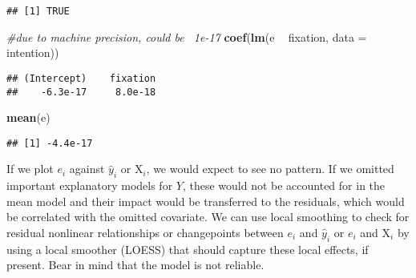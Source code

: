 \documentclass[
]{book}
\newenvironment{Shaded}{\begin{snugshade}}{\end{snugshade}}
\newcommand{\CharTok}[1]{\textcolor[rgb]{0.31,0.60,0.02}{#1}}
\newcommand{\CommentTok}[1]{\textcolor[rgb]{0.56,0.35,0.01}{\textit{#1}}}
\newcommand{\DataTypeTok}[1]{\textcolor[rgb]{0.13,0.29,0.53}{#1}}
\newcommand{\DecValTok}[1]{\textcolor[rgb]{0.00,0.00,0.81}{#1}}
\newcommand{\KeywordTok}[1]{\textcolor[rgb]{0.13,0.29,0.53}{\textbf{#1}}}
\newcommand{\NormalTok}[1]{#1}
\newcommand{\OperatorTok}[1]{\textcolor[rgb]{0.81,0.36,0.00}{\textbf{#1}}}
\newcommand{\StringTok}[1]{\textcolor[rgb]{0.31,0.60,0.02}{#1}}
\begin{document}
\begin{verbatim}
## [1] TRUE
\end{verbatim}

\begin{Shaded}
\begin{Highlighting}[]
\CommentTok{#due to machine precision, could be ~1e-17}
\KeywordTok{coef}\NormalTok{(}\KeywordTok{lm}\NormalTok{(e }\OperatorTok{~}\StringTok{ }\NormalTok{fixation, }\DataTypeTok{data =}\NormalTok{ intention))}
\end{Highlighting}
\end{Shaded}

\begin{verbatim}
## (Intercept)    fixation 
##    -6.3e-17     8.0e-18
\end{verbatim}

\begin{Shaded}
\begin{Highlighting}[]
\KeywordTok{mean}\NormalTok{(e)}
\end{Highlighting}
\end{Shaded}

\begin{verbatim}
## [1] -4.4e-17
\end{verbatim}

If we plot \(e_i\) against \(\hat{y}_i\) or \(\mathrm{X}_i\), we would expect to see no pattern. If we omitted important explanatory models for \(Y\), these would not be accounted for in the mean model and their impact would be transferred to the residuals, which would be correlated with the omitted covariate. We can use local smoothing to check for residual nonlinear relationships or changepoints between \(e_i\) and \(\hat{y}_i\) or \(e_i\) and \(\mathrm{X}_{i}\) by using a local smoother (LOESS) that should capture these local effects, if present. Bear in mind that the model is not reliable.

\begin{Shaded}
\end{Shaded}
\end{document}
